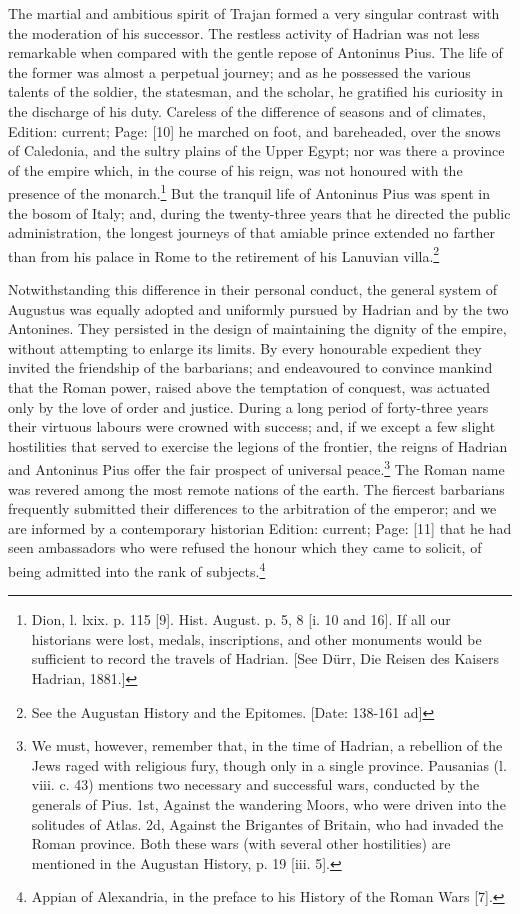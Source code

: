 The martial and ambitious spirit of Trajan formed a very singular contrast with the moderation of his successor. The restless activity of Hadrian was not less remarkable when compared with the gentle repose of Antoninus Pius. The life of the former was almost a perpetual journey; and as he possessed the various talents of the soldier, the statesman, and the scholar, he gratified his curiosity in the discharge of his duty. Careless of the difference of seasons and of climates, Edition: current; Page: [10] he marched on foot, and bareheaded, over the snows of Caledonia, and the sultry plains of the Upper Egypt; nor was there a province of the empire which, in the course of his reign, was not honoured with the presence of the monarch.\footnote{Dion, l. lxix. p. 115 [9]. Hist. August. p. 5, 8 [i. 10 and 16]. If all our historians were lost, medals, inscriptions, and other monuments would be sufficient to record the travels of Hadrian. [See Dürr, Die Reisen des Kaisers Hadrian, 1881.]} But the tranquil life of Antoninus Pius was spent in the bosom of Italy; and, during the twenty-three years that he directed the public administration, the longest journeys of that amiable prince extended no farther than from his palace in Rome to the retirement of his Lanuvian villa.\footnote{See the Augustan History and the Epitomes. [Date: 138-161 ad]}

Notwithstanding this difference in their personal conduct, the general system of Augustus was equally adopted and uniformly pursued by Hadrian and by the two Antonines. They persisted in the design of maintaining the dignity of the empire, without attempting to enlarge its limits. By every honourable expedient they invited the friendship of the barbarians; and endeavoured to convince mankind that the Roman power, raised above the temptation of conquest, was actuated only by the love of order and justice. During a long period of forty-three years their virtuous labours were crowned with success; and, if we except a few slight hostilities that served to exercise the legions of the frontier, the reigns of Hadrian and Antoninus Pius offer the fair prospect of universal peace.\footnote{We must, however, remember that, in the time of Hadrian, a rebellion of the Jews raged with religious fury, though only in a single province. Pausanias (l. viii. c. 43) mentions two necessary and successful wars, conducted by the generals of Pius. 1st, Against the wandering Moors, who were driven into the solitudes of Atlas. 2d, Against the Brigantes of Britain, who had invaded the Roman province. Both these wars (with several other hostilities) are mentioned in the Augustan History, p. 19 [iii. 5].} The Roman name was revered among the most remote nations of the earth. The fiercest barbarians frequently submitted their differences to the arbitration of the emperor; and we are informed by a contemporary historian Edition: current; Page: [11] that he had seen ambassadors who were refused the honour which they came to solicit, of being admitted into the rank of subjects.\footnote{Appian of Alexandria, in the preface to his History of the Roman Wars [7].}

